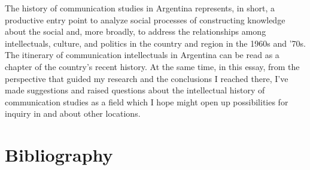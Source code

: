 \documentclass{tufte-handout}
\begin{document}
The history of communication studies in Argentina represents, in short,
a productive entry point to analyze social processes of constructing
knowledge about the social and, more broadly, to address the
relationships among intellectuals, culture, and politics in the country
and region in the 1960s and '70s. The itinerary of communication
intellectuals in Argentina can be read as a chapter of the country's
recent history. At the same time, in this essay, from the perspective
that guided my research and the conclusions I reached there, I've made
suggestions and raised questions about the intellectual history of
communication studies as a field which I hope might open up
possibilities for inquiry in and about other locations.







\section{Bibliography}\label{bibliography}
\end{document}
